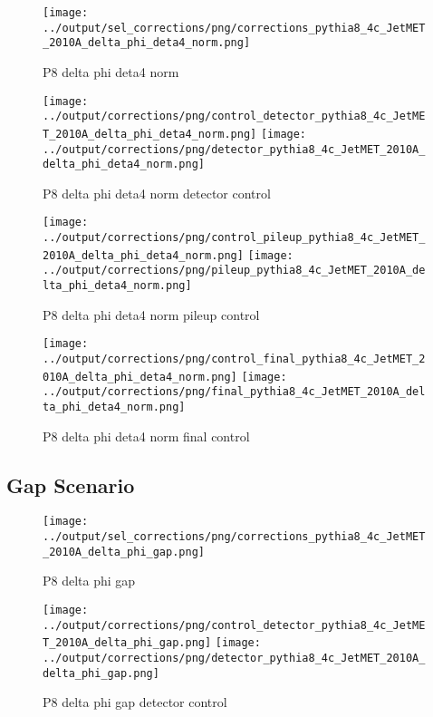 \documentclass[11pt]{book}
\begin{document}
\begin{figure}[ht]
\centering
\texttt{[image: ../output/sel\_corrections/png/corrections\_pythia8\_4c\_JetMET\_2010A\_delta\_phi\_deta4\_norm.png]}
\caption{P8 delta phi deta4 norm}
\label{fig:p8_JetMET_2010A_delta_phi_deta4_norm}
\end{figure}

\begin{figure}[ht]
\centering
\texttt{[image: ../output/corrections/png/control\_detector\_pythia8\_4c\_JetMET\_2010A\_delta\_phi\_deta4\_norm.png]}
\texttt{[image: ../output/corrections/png/detector\_pythia8\_4c\_JetMET\_2010A\_delta\_phi\_deta4\_norm.png]}
\caption{P8 delta phi deta4 norm detector control}
\label{fig:p8_JetMET_2010A_delta_phi_deta4_norm_detector_control}
\end{figure}

\begin{figure}[ht]
\centering
\texttt{[image: ../output/corrections/png/control\_pileup\_pythia8\_4c\_JetMET\_2010A\_delta\_phi\_deta4\_norm.png]}
\texttt{[image: ../output/corrections/png/pileup\_pythia8\_4c\_JetMET\_2010A\_delta\_phi\_deta4\_norm.png]}
\caption{P8 delta phi deta4 norm pileup control}
\label{fig:p8_JetMET_2010A_delta_phi_deta4_norm_pileup_control}
\end{figure}


\begin{figure}[ht]
\centering
\texttt{[image: ../output/corrections/png/control\_final\_pythia8\_4c\_JetMET\_2010A\_delta\_phi\_deta4\_norm.png]}
\texttt{[image: ../output/corrections/png/final\_pythia8\_4c\_JetMET\_2010A\_delta\_phi\_deta4\_norm.png]}
\caption{P8 delta phi deta4 norm final control}
\label{fig:p8_JetMET_2010A_delta_phi_deta4_norm_final_control}
\end{figure}

\clearpage
\subsection{Gap Scenario}

\begin{figure}[ht]
\centering
\texttt{[image: ../output/sel\_corrections/png/corrections\_pythia8\_4c\_JetMET\_2010A\_delta\_phi\_gap.png]}
\caption{P8 delta phi gap}
\label{fig:p8_JetMET_2010A_delta_phi_gap}
\end{figure}


\begin{figure}[ht]
\centering
\texttt{[image: ../output/corrections/png/control\_detector\_pythia8\_4c\_JetMET\_2010A\_delta\_phi\_gap.png]}
\texttt{[image: ../output/corrections/png/detector\_pythia8\_4c\_JetMET\_2010A\_delta\_phi\_gap.png]}
\caption{P8 delta phi gap detector control}
\label{fig:p8_JetMET_2010A_delta_phi_gap_detector_control}
\end{figure}
\end{document}
